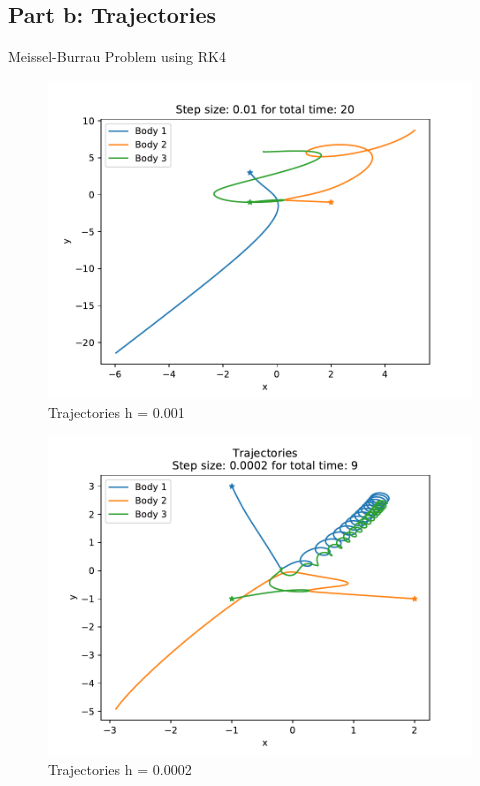 \documentclass[12pt,a4paper,twoside]{article}
\begin{document}
\subsection*{Part b: Trajectories}
Meissel-Burrau Problem using RK4

\begin{figure}[h]
  \centering
  \includegraphics[]{figs/exercise03_2_stepsize001_time20.pdf}
  \caption{Trajectories h = 0.001}
\end{figure}
\begin{figure}[h]
  \centering
  \includegraphics[]{figs/exercise03_2_stepsize00002_time9.pdf}
  \caption{Trajectories h = 0.0002}
\end{figure}
\end{document}
